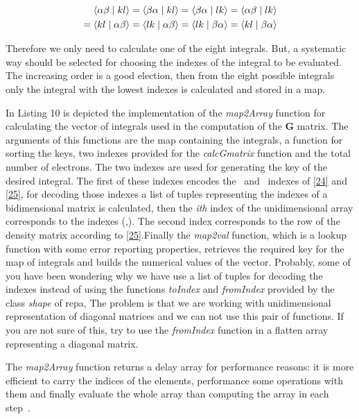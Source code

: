 \documentclass{tmr}
\begin{document}
\begin{equation} \label{27}
\begin{split}
\braket{\alpha \beta \mid kl} = \braket{ \beta \alpha \mid kl} 
= \braket{\beta \alpha \mid lk} = \braket{\alpha \beta \mid lk} \\
= \braket{kl\mid \alpha \beta} = \braket{lk \mid \alpha \beta} 
=\braket{lk \mid \beta \alpha} = \braket{kl\mid \beta \alpha}
\end{split}
\end{equation}

Therefore we only need to calculate one of the eight integrals. But, a systematic
way should be selected for choosing the indexes of the integral to be
evaluated. The increasing order is a good election, then from the eight possible integrals
only the integral with the lowest indexes is calculated and stored in a map. 

In Listing 10 is depicted the implementation of the \textit{map2Array} function for
calculating the vector of integrals used in the computation of the \textbf{G} matrix. The
arguments of this functions are the map containing the integrals, a function 
for sorting the keys, two indexes provided for the \textit{calcGmatrix} function
and the total number of electrons. The two indexes are used for generating
the key of the desired integral. The first of these indexes encodes the \textalpha\ and 
\textbeta\ indexes of \eqref{24} and \eqref{25}, for decoding those indexes a list
of tuples representing the indexes of a bidimensional matrix is calculated,
then the \textit{ith} index of the unidimensional array corresponds to the indexes (\textalpha,\textbeta).
The second index corresponds to the row of the density matrix according to \eqref{25}.Finally
the \textit{map2val} function, which is a lookup function with some error reporting properties, 
retrieves the required key for the map of integrals and builds the numerical values of the vector.
Probably, some of you have been wondering why we have use a list of tuples for decoding 
the indexes instead of using the functions \textit{toIndex} and \textit{fromIndex}
provided by the class \textit{shape} of repa, The problem is that we are working with
unidimensional representation of diagonal matrices and we can not use this pair of functions.
If you are not sure of this, try to use the \textit{fromIndex} function in a flatten array representing
a diagonal matrix.

The \textit{map2Array} function returns a delay array for performance reasons: it is more efficient
to carry the indices of the elements, performance some operations with them and finally
evaluate the whole array than computing the array in each step~\cite{fusion}.
\end{document}
